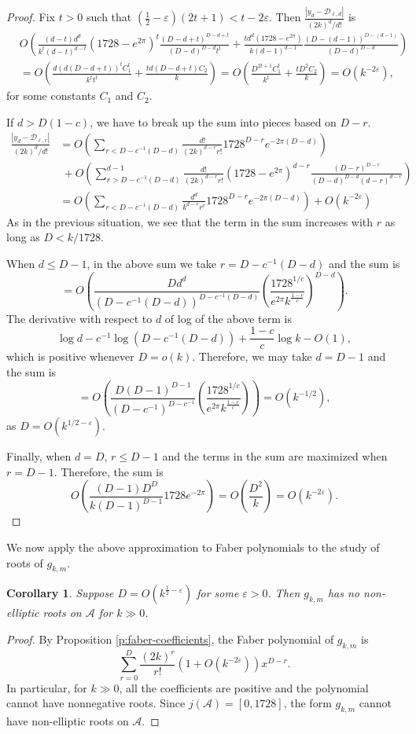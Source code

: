\documentclass[12pt]{amsart}
\theoremstyle{plain} %
\newtheorem{corollary}  [theorem]{Corollary}
\theoremstyle{definition}
\theoremstyle{remark}
\numberwithin{equation}{section}
\begin{document}
\begin{proof}
Fix $t>0$ such that $\left(\frac{1}{2}-\varepsilon \right)(2t+1)<t-2 \varepsilon$. Then $\frac{|y_d-\mathcal{D}_{\ell,d}|}{(2k)^d/d!}$ is
\begin{align*}
& O\left(\frac{(d-t)d^d}{k^{t}(d-t)^{d-t}}(1728-e^{2\pi})^{t}\frac{(D-d+t)^{D-d+t}}{(D-d)^{D-d}t^t}+\frac{td^d(1728-e^{2\pi})}{k(d-1)^{d-1}}\frac{(D-(d-1))^{D-(d-1)}}{(D-d)^{D-d}}\right)\\
  &=O\left( \frac{d(d(D-d+t))^tC_1^t}{k^tt^t} + \frac{td(D-d+t)C_2}{k}\right)=O\left( \frac{D^{2t+1}C_1^t}{k^t} + \frac{tD^2C_2}{k}\right)=O(k^{-2 \varepsilon}),
\end{align*}
for some constants $C_1$ and $C_2$.

If $d>D(1-c)$, we have to break up the sum into pieces based on $D-r$. 
\begin{align*}
  \frac{|y_d-\mathcal{D}_{\ell,r}|}{(2k)^d/d!}&=O\left(
                        \sum_{r<D-c^{-1}(D-d)}\frac{d!}{(2k)^{d-r}r!}1728^{D-r}e^{-2\pi(D-d)}\right)\\
  &\
    +O\left(\sum_{r>D-c^{-1}(D-d)}^{d-1}\frac{d!}{(2k)^{d-r}r!}(1728-e^{2\pi})^{d-r}\frac{(D-r)^{D-r}}{(D-d)^{D-d}(d-r)^{d-r}}\right)\\
  &=O\left(
                        \sum_{r<D-c^{-1}(D-d)}\frac{d^d}{k^{d-r}r^r}1728^{D-r}e^{-2\pi(D-d)}\right)+O(k^{-2
    \varepsilon})
\end{align*}
As in the previous situation, we see that the term in the sum
increases with $r$ as long as $D<k/1728$.

When $d\leq D-1$, in the above sum we take $r=D-c^{-1}(D-d)$ and the sum is
\[=O\left(\frac{Dd^d}{(D-c^{-1}(D-d))^{D-c^{-1}(D-d)}}\left(\frac{1728^{1/c}}{e^{2\pi}k^{\frac{1-c}{c}}}\right)^{D-d}\right).\]
The derivative with respect to $d$ of log of the above term is
\[\log d-c^{-1}\log (D-c^{-1}(D-d))+\frac{1-c}{c}\log k-O(1),\]
which is positive whenever $D=o(k)$. Therefore, we may take
$d=D-1$ and the sum is
\[=O\left(\frac{D(D-1)^{D-1}}{(D-c^{-1})^{D-c^{-1}}}\left(\frac{1728^{1/c}}{e^{2\pi}k^{\frac{1-c}{c}}}\right)\right)=O(k^{-1/2}),\]
as $D=O(k^{1/2-\varepsilon})$.

Finally, when $d=D$, $r\leq D-1$ and the terms in the sum are
maximized when $r=D-1$. Therefore, the sum is
\[O\left(\frac{(D-1)D^D}{k(D-1)^{D-1}}1728e^{-2\pi}\right)=O\left(\frac{D^2}{k}\right)=O(k^{-2 \varepsilon}).\]
\end{proof}

We now apply the above approximation to Faber polynomials to the
study of roots of $g_{k,m}$.
\begin{corollary}
Suppose $D=O(k^{\frac{1}{2}-\varepsilon})$ for some $\varepsilon>0$. Then $g_{k,m}$ has no non-elliptic roots on $\mathcal{A}$ for $k\gg 0$. 
\end{corollary}
\begin{proof}
By Proposition \ref{p:faber-coefficients}, the Faber polynomial
of $g_{k,m}$ is
\[\sum_{r=0}^D \frac{(2k)^r}{r!}\left(1+O(k^{-2
  \varepsilon})\right)x^{D-r}.\]
In particular, for $k\gg 0$, all the coefficients are positive and the polynomial cannot have nonnegative roots. Since $j(\mathcal{A})=[0,1728]$, the form $g_{k,m}$ cannot have non-elliptic roots on $\mathcal{A}$. 
\end{proof}
\end{document}
